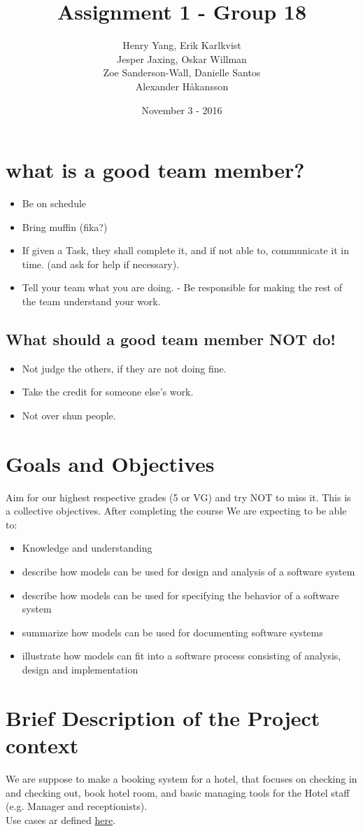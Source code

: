 \documentclass[utf8]{article}
\title{Assignment 1 - Group 18}
\author{Henry Yang, Erik Karlkvist \\Jesper Jaxing, Oskar Willman\\ Zoe Sanderson-Wall, Danielle Santos\\Alexander Håkansson}
\date{November 3 - 2016}
\begin{document}
	\maketitle
	\section{what is a good team member?}
	\begin{itemize}
		\item Be on schedule
		\item Bring muffin (fika?)
		\item If given a Task, they shall complete it, and if not able to, communicate it in time. (and ask for help if necessary).
		\item Tell your team what you are doing. - Be responsible for making the rest of the team understand your work.
	\end{itemize}
	\subsection{What should a good team member NOT do!}
	\begin{itemize}
		\item Not judge the others, if they are not doing fine.
		\item Take the credit for someone else's work.
		\item Not over shun people.
	\end{itemize}
	\section{Goals and Objectives}
	Aim for our highest respective grades (5 or VG) and try NOT to miss it. This is a collective objectives.
	After completing the course We are expecting to be able to:
	\begin{itemize}
		\item Knowledge and understanding
		\item describe how models can be used for design and analysis of a software system
		\item describe how models can be used for specifying the behavior of a software system
		\item summarize how models can be used for documenting software systems
		\item illustrate how models can fit into a software process consisting of analysis, design and implementation
	\end{itemize}
	\section{Brief Description of the Project context}
	We are suppose to make a booking system for a hotel, that focuses on checking in and checking out, book hotel room, and basic managing tools for the Hotel staff (e.g. Manager and receptionists).
	\\Use cases ar defined \href{https://pingpong.chalmers.se/courseId/7502/node.do?id=3369884}{here}.
\end{document}
